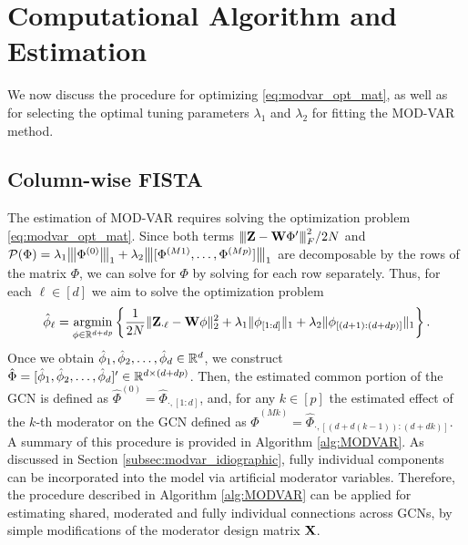 \section{Computational Algorithm and Estimation}\label{section:computation}

We now discuss the procedure for optimizing \eqref{eq:modvar_opt_mat}, as well as for selecting the optimal tuning parameters $\lambda_1$ and $\lambda_2$ for fitting the MOD-VAR method. 

\subsection{Column-wise FISTA}

The estimation of MOD-VAR requires solving the optimization problem \eqref{eq:modvar_opt_mat}. Since both terms ${\left\vert\kern-0.25ex\left\vert\kern-0.25ex\left\vert \mathbf{Z} - \mathbf{W} \Phi' \right\vert\kern-0.25ex\right\vert\kern-0.25ex\right\vert}_F^2 / 2N$ and $\mathcal{P}(\Phi) = \lambda_1 {\left\vert\kern-0.25ex\left\vert\kern-0.25ex\left\vert \Phi^{(0)} \right\vert\kern-0.25ex\right\vert\kern-0.25ex\right\vert}_1 + \lambda_2 {\left\vert\kern-0.25ex\left\vert\kern-0.25ex\left\vert [\Phi^{(M1)},\ldots , \Phi^{(Mp)}] \right\vert\kern-0.25ex\right\vert\kern-0.25ex\right\vert}_1$ are decomposable by the rows of the matrix $\Phi$, we can solve for $\Phi$ by solving for each row separately. Thus, for each $\ell \in[d]$ we aim to solve the optimization problem
\begin{equation}\label{eq:modvar_lasso_columnwise}
	\hat\phi_\ell = \mathop{\mathrm{argmin}}_{\phi\in\mathbb{R}^{d+dp}} \left\{\frac{1}{2N} \| \mathbf{Z}_{\cdot \ell}  - \mathbf{W} \phi\|_2^2 + \lambda_1 \|\phi_{[1:d]}\|_1 + \lambda_2 \|\phi_{[(d+1):(d+ dp)]}\|_1 \right\}.
\end{equation}
Once we obtain $\hat\phi_1,\hat\phi_2,\ldots, \hat\phi_d\in\mathbb{R}^{d}$, we construct $\hat\Phi = [\hat\phi_1,\hat\phi_2,\ldots, \hat\phi_d]'\in\mathbb{R}^{d\times (d+dp)}$. Then, the estimated common portion of the GCN is defined as $\hat\Phi^{(0)} = \hat\Phi_{\cdot, [1:d]}$, and, for any $k\in[p]$ the estimated effect of the $k$-th moderator on the GCN defined as $\hat\Phi^{(M k)} = \hat\Phi_{\cdot, [(d+ d(k-1)):(d+dk)]}$. A summary of this procedure is provided in Algorithm \ref{alg:MODVAR}. As discussed in Section \ref{subsec:modvar_idiographic}, fully individual components can be incorporated into the model via artificial moderator variables. Therefore, the procedure described in Algorithm \ref{alg:MODVAR} can be applied for estimating shared, moderated and fully individual connections across GCNs, by simple modifications of the moderator design matrix $\mathbf{X}$. 

